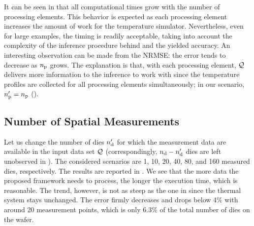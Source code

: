It can be seen in  that all computational times grow with the number of processing elements.
This behavior is expected as each processing element increases the amount of work for the temperature simulator.
Nevertheless, even for large examples, the timing is readily acceptable, taking into account the complexity of the inference procedure behind and the yielded accuracy.
An interesting observation can be made from the NRMSE: the error tends to decrease as ${n_\text{p}}$ grows.
The explanation is that, with each processing element, $\mathcal{Q}$ delivers more information to the inference to work with since the temperature profiles are collected for all processing elements simultaneously; in our scenario, ${n_\text{p}'} = {n_\text{p}}$ ().

\subsection{Number of Spatial Measurements}
Let us change the number of dies ${n_\text{d}'}$ for which the measurement data are available in the input data set $\mathcal{Q}$ (correspondingly, ${n_\text{d}} - {n_\text{d}'}$ dies are left unobserved in ). The considered scenarios are 1, 10, 20, 40, 80, and 160 measured dies, respectively. The results are reported in .
We see that the more data the proposed framework needs to process, the longer the execution time, which is reasonable. The trend, however, is not as steep as the one in  since the thermal system stays unchanged.
The error firmly decreases and drops below 4\% with around 20 measurement points, which is only 6.3\% of the total number of dies on the wafer.

